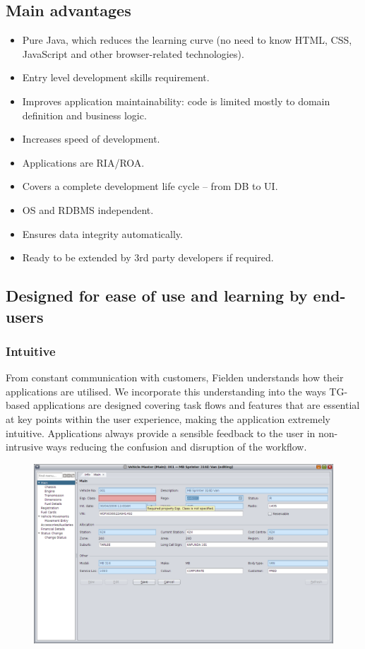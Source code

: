 \documentclass[a4paper,12pt,twocolumn]{article}
\begin{document}
\subsection*{Main advantages}
  \begin{itemize}
    \item Pure Java, which reduces the learning curve (no need to know HTML, CSS, JavaScript and other browser-related technologies).
    \item Entry level development skills requirement.
    \item Improves application maintainability: code is limited mostly to domain definition and business logic.
    \item Increases speed of development.
    \item Applications are RIA/ROA.
    \item Covers a complete development life cycle -- from DB to UI.
    \item OS and RDBMS independent.
    \item Ensures data integrity automatically.
    \item Ready to be extended by 3rd party developers if required.
  \end{itemize}

\subsection*{Designed for ease of use and learning by end-users}
 
\subsubsection*{Intuitive}
  From constant communication with customers, Fielden understands how their applications are utilised. 
  We incorporate this understanding into the ways TG-based applications are designed covering task flows and features that are essential at key points within the user experience, making the application extremely intuitive.
  Applications always provide a sensible feedback to the user in non-intrusive ways reducing the confusion and disruption of the workflow.
  \begin{figure}[!h]
  \centering
  \includegraphics[scale=0.17]{images/04-veh-master-main-error.png}
  \end{figure}
\end{document}
